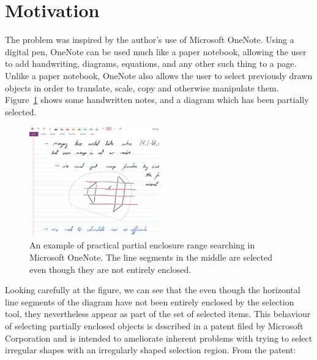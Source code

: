 \section{Motivation}
\label{:intro:motivation}

The problem was inspired by the author's use of Microsoft OneNote. 
Using a digital pen, OneNote can be used much like a paper notebook, allowing the user to add handwriting, diagrams, equations, and any other such thing to a page.
Unlike a paper notebook, OneNote also allows the user to select previously drawn objects in order to translate, scale, copy and otherwise manipulate them.
Figure~\ref{fig:intro:onenote} shows some handwritten notes, and a diagram which has been partially selected.

\begin{figure}
\begin{center}
  \includegraphics[width=0.50\textwidth]{figures/fig_onenote}
  \caption[An example of practical partial enclosure range searching]{An example of practical partial enclosure range searching in Microsoft OneNote. The line segments in the middle are selected even though they are not entirely enclosed.}
  \label{fig:intro:onenote}
\end{center}
\end{figure}

Looking carefully at the figure, we can see that the even though the horizontal line segments of the diagram have not been entirely enclosed by the selection tool, they nevertheless appear as part of the set of selected items.
This behaviour of selecting partially enclosed objects is described in a patent filed by Microsoft Corporation\cite{lassoselect} and is intended to ameliorate inherent problems with trying to select irregular shapes with an irregularly shaped selection region. 
From the patent:

